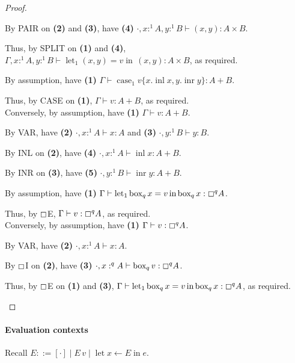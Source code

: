 \documentclass[acmsmall,screen,nonacm]{acmart}
\DeclareMathOperator{\llet}{\text{let}}
\DeclareMathOperator{\lin}{\text{in}}
\DeclareMathOperator{\case}{\text{case}}
\DeclareMathOperator{\bbox}{\text{box}}
\DeclareMathOperator{\inl}{\text{inl}}
\DeclareMathOperator{\inr}{\text{inr}}
\newcommand{\tee}{\vdash}
\begin{document}
\begin{proof}
\begin{description}
    By PAIR on \textbf{(2)} and \textbf{(3)}, have \textbf{(4)} $\cdot, x :^1 A, y :^1 B \tee (x, y) : A \times B$.

    Thus, by SPLIT on \textbf{(1)} and \textbf{(4)}, $\Gamma, x :^1 A, y :^1 B \tee \llet_1 (x, y) = v \lin \, (x, y) : A \times B$, as required.
    \\
    \item[Case $\case_1 v \{x.\inl x; y.\inr y\} \equiv v : \,^q A + B$.]
    By assumption, have \textbf{(1)} $\Gamma \tee \case_1 v \{x.\inl x, y.\inr y\} : A + B$.
    
    Thus, by CASE on \textbf{(1)}, $\Gamma \tee v : A + B$, as required.
    \\

    Conversely, by assumption, have \textbf{(1)} $\Gamma \tee v : A + B$.
    
    By VAR, have \textbf{(2)} $\cdot, x :^1 A \tee x : A$ and \textbf{(3)} $\cdot, y :^1 B \tee y : B$.

    By INL on \textbf{(2)}, have \textbf{(4)} $\cdot, x :^1 A \tee \inl x : A + B$.
    
    By INR on \textbf{(3)}, have \textbf{(5)} $\cdot, y :^1 B \tee \inr y : A + B$.
    \\
    \item[Case $\llet_1 \bbox_q x = v \lin \bbox_q x \equiv v : \boxempty^q A$.]
    By assumption, have \textbf{(1)} $\Gamma \tee \llet_1 \bbox_q x = v \lin \bbox_q x : \boxempty^q A$.

    Thus, by $\boxempty$E, $\Gamma \tee v : \boxempty^q A$, as required.
    \\

    Conversely, by assumption, have \textbf{(1)} $\Gamma \tee v : \boxempty^q A$.

    By VAR, have \textbf{(2)} $\cdot, x :^1 A \tee x : A$.

    By $\boxempty$I on \textbf{(2)}, have \textbf{(3)} $\cdot, x :^q A \tee \bbox_q v : \boxempty^q A$.

    Thus, by $\boxempty$E on \textbf{(1)} and \textbf{(3)}, $\Gamma \tee \llet_1 \bbox_q x = v \lin \bbox_q x : \boxempty^q A$, as required.
  \end{description}
\end{proof}

\paragraph{Evaluation contexts}
Recall $E ::= [\cdot] \mid E\, v \mid \llet x \leftarrow E \lin e$.
\end{document}
